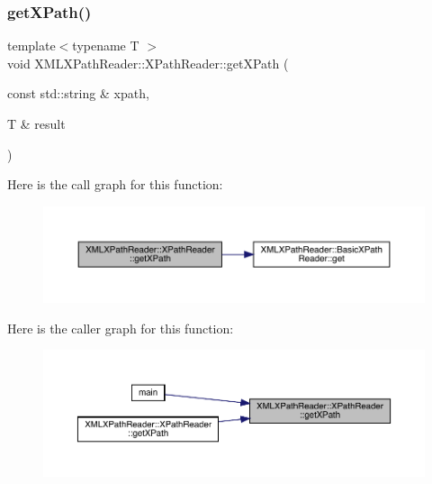 \subsubsection{\texorpdfstring{getXPath()}{getXPath()}\hspace{0.1cm}{\footnotesize\ttfamily [2/9]}}
{\footnotesize\ttfamily template$<$typename T $>$ \\
void X\+M\+L\+X\+Path\+Reader\+::\+X\+Path\+Reader\+::get\+X\+Path (\begin{DoxyParamCaption}\item[{const std\+::string \&}]{xpath,  }\item[{T \&}]{result }\end{DoxyParamCaption})\hspace{0.3cm}{\ttfamily [inline]}}

Here is the call graph for this function\+:
\nopagebreak
\begin{figure}[H]
\begin{center}
\leavevmode
\includegraphics[width=350pt]{d3/d5a/classXMLXPathReader_1_1XPathReader_abbd673bc00e75502126b2cca246ff6f4_cgraph}
\end{center}
\end{figure}
Here is the caller graph for this function\+:
\nopagebreak
\begin{figure}[H]
\begin{center}
\leavevmode
\includegraphics[width=350pt]{d3/d5a/classXMLXPathReader_1_1XPathReader_abbd673bc00e75502126b2cca246ff6f4_icgraph}
\end{center}
\end{figure}
\mbox{\label{classXMLXPathReader_1_1XPathReader_abbd673bc00e75502126b2cca246ff6f4}} 
